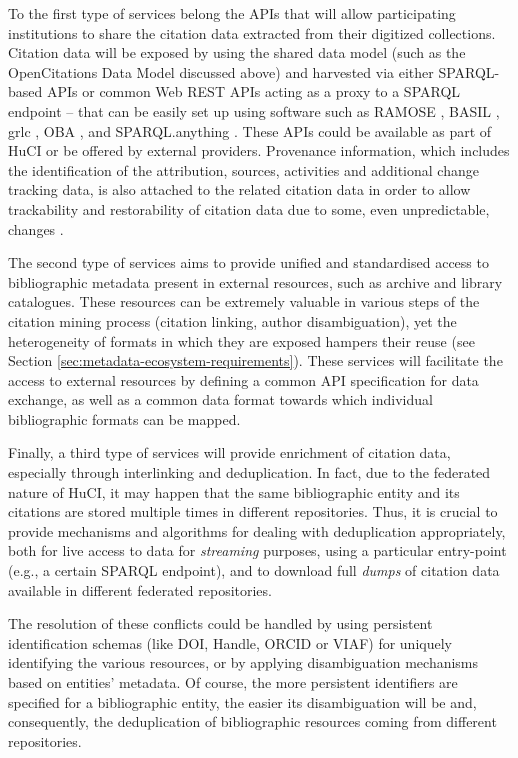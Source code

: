 To the first type of services belong the APIs that will allow participating institutions to share the citation data extracted from their digitized collections. Citation data will be exposed by using the shared data model (such as the OpenCitations Data Model discussed above) and harvested via either SPARQL-based APIs or common Web REST APIs acting as a proxy to a SPARQL endpoint -- that can be easily set up using software such as RAMOSE \cite{daquino_creating_2020}, BASIL \cite{daga_basil_nodate}, grlc \cite{sack_grlc_2016}, OBA \cite{pan_oba_2020}, and SPARQL.anything \cite{daga_facade-x_2021}. These APIs could be available as part of HuCI or be offered by external providers. Provenance information, which includes the identification of the attribution, sources, activities and additional change tracking data, is also attached to the related citation data in order to allow trackability and restorability of citation data due to some, even unpredictable, changes \cite{peroni_document-inspired_2016}.

The second type of services aims to provide unified and standardised access to bibliographic metadata present in external resources, such as archive and library catalogues. These resources can be extremely valuable in various steps of the citation mining process (citation linking, author disambiguation), yet the heterogeneity of formats in which they are exposed hampers their reuse (see Section \ref{sec:metadata-ecosystem-requirements}). These services will facilitate the access to external resources by defining a common API specification for data exchange, as well as a common data format towards which individual bibliographic formats can be mapped.

Finally, a third type of services will provide enrichment of citation data, especially through interlinking and deduplication. In fact, due to the federated nature of HuCI, it may happen that the same bibliographic entity and its citations are stored multiple times in different repositories. Thus, it is crucial to provide mechanisms and algorithms for dealing with deduplication appropriately, both for live access to data for \textit{streaming} purposes, using a particular entry-point (e.g., a certain SPARQL endpoint), and to download full \textit{dumps} of citation data available in different federated repositories.

The resolution of these conflicts could be handled by using persistent identification schemas (like DOI, Handle, ORCID or VIAF) for uniquely identifying the various resources, or by applying disambiguation mechanisms based on entities’ metadata. Of course, the more persistent identifiers are specified for a bibliographic entity, the easier its disambiguation will be and, consequently, the deduplication of bibliographic resources coming from different repositories.

